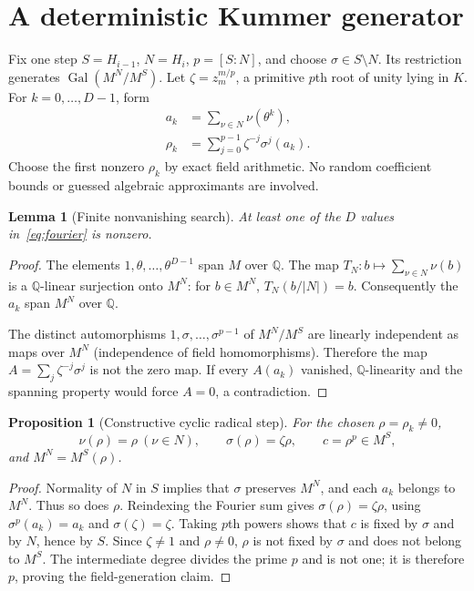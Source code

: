 \documentclass[11pt,a4paper]{article}
\newcommand{\Q}{\mathbb Q}
\newcommand{\Gal}{\operatorname{Gal}}
\newtheorem{proposition}[theorem]{Proposition}
\newtheorem{lemma}[theorem]{Lemma}
\theoremstyle{definition}
\begin{document}
\section{A deterministic Kummer generator}
Fix one step $S=H_{i-1}$, $N=H_i$, $p=[S:N]$, and choose
$\sigma\in S\setminus N$. Its restriction generates $\Gal(M^N/M^S)$.
Let $\zeta=z_m^{m/p}$, a primitive $p$th root of unity lying in $K$.
For $k=0,\ldots,D-1$, form
\begin{align}
 a_k&=\sum_{\nu\in N}\nu(\theta^k),\label{eq:trace}\\
 \rho_k&=\sum_{j=0}^{p-1}\zeta^{-j}\sigma^j(a_k).\label{eq:fourier}
\end{align}
Choose the first nonzero $\rho_k$ by exact field arithmetic. No random
coefficient bounds or guessed algebraic approximants are involved.

\begin{lemma}[Finite nonvanishing search]\label{lem:nonzero}
At least one of the $D$ values in~\eqref{eq:fourier} is nonzero.
\end{lemma}
\begin{proof}
The elements $1,\theta,\ldots,\theta^{D-1}$ span $M$ over $\Q$. The map
$T_N:b\mapsto\sum_{\nu\in N}\nu(b)$ is a $\Q$-linear surjection onto $M^N$:
for $b\in M^N$, $T_N(b/|N|)=b$. Consequently the $a_k$ span $M^N$ over $\Q$.

The distinct automorphisms $1,\sigma,\ldots,\sigma^{p-1}$ of $M^N/M^S$ are
linearly independent as maps over $M^N$ (independence of field homomorphisms).
Therefore the map $A=\sum_j\zeta^{-j}\sigma^j$ is not the zero map. If every
$A(a_k)$ vanished, $\Q$-linearity and the spanning property would force $A=0$,
a contradiction.
\end{proof}

\begin{proposition}[Constructive cyclic radical step]\label{prop:kummer}
For the chosen $\rho=\rho_k\ne0$,
\[
 \nu(\rho)=\rho\ (\nu\in N),\qquad
 \sigma(\rho)=\zeta\rho,\qquad
 c=\rho^p\in M^S,
\]
and $M^N=M^S(\rho)$.
\end{proposition}
\begin{proof}
Normality of $N$ in $S$ implies that $\sigma$ preserves $M^N$, and each $a_k$
belongs to $M^N$. Thus so does $\rho$. Reindexing the Fourier sum gives
$\sigma(\rho)=\zeta\rho$, using $\sigma^p(a_k)=a_k$ and $\sigma(\zeta)=\zeta$.
Taking $p$th powers shows that $c$ is fixed by $\sigma$ and by $N$, hence by $S$.
Since $\zeta\ne1$ and $\rho\ne0$, $\rho$ is not fixed by $\sigma$ and does not
belong to $M^S$. The intermediate degree divides the prime $p$ and is not one;
it is therefore $p$, proving the field-generation claim.
\end{proof}
\end{document}
